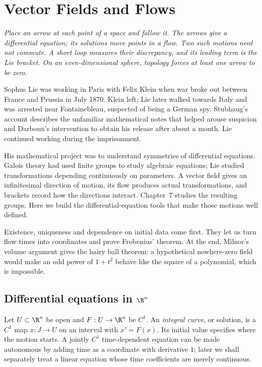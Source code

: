 \chapter{Vector Fields and Flows}

\begin{center}\itshape
Place an arrow at each point of a space and follow it. The arrows give a differential equation; its solutions move points in a flow. Two such motions need not commute. A short loop measures their discrepancy, and its leading term is the Lie bracket. On an even-dimensional sphere, topology forces at least one arrow to be zero.
\end{center}

Sophus Lie was working in Paris with Felix Klein when war broke out between France and Prussia in July 1870. Klein left; Lie later walked towards Italy and was arrested near Fontainebleau, suspected of being a German spy. Stubhaug's account describes the unfamiliar mathematical notes that helped arouse suspicion and Darboux's intervention to obtain his release after about a month. Lie continued working during the imprisonment.

His mathematical project was to understand symmetries of differential equations. Galois theory had used finite groups to study algebraic equations; Lie studied transformations depending continuously on parameters. A vector field gives an infinitesimal direction of motion, its flow produces actual transformations, and brackets record how the directions interact. Chapter~7 studies the resulting groups. Here we build the differential-equation tools that make those motions well defined.

Existence, uniqueness and dependence on initial data come first. They let us turn flow times into coordinates and prove Frobenius' theorem. At the end, Milnor's volume argument gives the hairy ball theorem: a hypothetical nowhere-zero field would make an odd power of $1+t^2$ behave like the square of a polynomial, which is impossible.

\section{Differential equations in \texorpdfstring{$\R^n$}{R\^{}n}}

Let $U\subset\R^n$ be open and $F:U\to\R^n$ be $C^1$. An \emph{integral curve}, or solution, is a $C^1$ map $x:J\to U$ on an interval with $x'=F(x)$. Its initial value specifies where the motion starts. A jointly $C^1$ time-dependent equation can be made autonomous by adding time as a coordinate with derivative $1$; later we shall separately treat a linear equation whose time coefficients are merely continuous.

